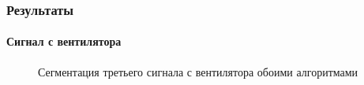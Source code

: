 \documentclass[9pt]{beamer}
\begin{document}
\begin{frame}\frametitle{Результаты}
\framesubtitle{Сигнал с вентилятора}

\begin{figure}[h]
\begin{minipage}[h]{0.49\linewidth}
\end{minipage}
\begin{minipage}[h]{0.49\linewidth}
\end{minipage}
\caption{Сегментация третьего сигнала с вентилятора обоими алгоритмами}
\end{figure}
\end{frame}
\end{document}
